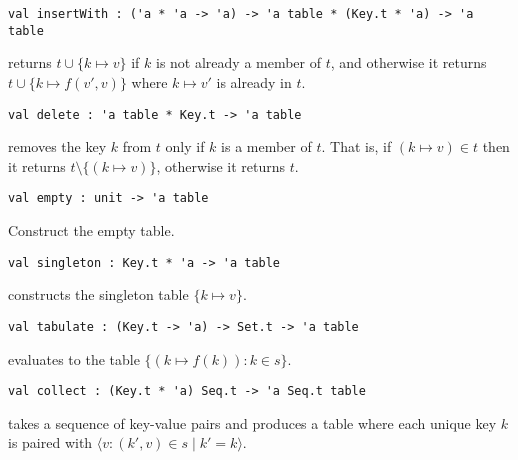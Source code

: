 \begin{gram}[insertWith]
\begin{verbatim}
val insertWith : ('a * 'a -> 'a) -> 'a table * (Key.t * 'a) -> 'a table
\end{verbatim}
 returns $t \cup \{k \mapsto v\}$ if $k$ is not
already a member of $t$, and otherwise it returns $t \cup \{k \mapsto f(v',v)\}$
where $k \mapsto v'$ is already in $t$.
\end{gram}

\begin{gram}[delete]
\begin{verbatim}
val delete : 'a table * Key.t -> 'a table
\end{verbatim}
 removes the key $k$ from $t$ only if $k$ is a member of $t$.
That is, if $(k \mapsto v) \in t$ then it returns
$t \setminus \{(k \mapsto v)\}$, otherwise it returns $t$.
\end{gram}

\begin{gram}[empty]
\begin{verbatim}
val empty : unit -> 'a table
\end{verbatim}
Construct the empty table.
\end{gram}

\begin{gram}[singleton]
\label{gr:ordtable-interface:singleton}
\begin{verbatim}
val singleton : Key.t * 'a -> 'a table
\end{verbatim}
 constructs the singleton table $\{k \mapsto v\}$.
\end{gram}

\begin{gram}[tabulate]
\begin{verbatim}
val tabulate : (Key.t -> 'a) -> Set.t -> 'a table
\end{verbatim}
 evaluates to the table $\{(k \mapsto f(k)) : k \in s\}$.
\end{gram}

\begin{gram}[collect]
\begin{verbatim}
val collect : (Key.t * 'a) Seq.t -> 'a Seq.t table
\end{verbatim}
 takes a sequence of key-value pairs and produces a table where
each unique key $k$ is paired with
$\langle v : (k',v) \in s \mathbin| k' = k \rangle$.
\end{gram}

